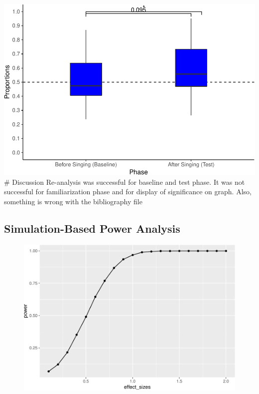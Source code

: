 \documentclass[man,floatsintext]{apa6}
\begin{document}
\includegraphics{Midterm_APA_files/figure-latex/unnamed-chunk-3-1.pdf}
\# Discussion Re-analysis was successful for baseline and test phase. It
was not successful for familiarization phase and for display of
significance on graph. Also, something is wrong with the bibliography
file

\subsection{Simulation-Based Power
Analysis}\label{simulation-based-power-analysis}

\begin{figure}
\centering
\includegraphics{Midterm_APA_files/figure-latex/unnamed-chunk-4-1.pdf}
\caption{}
\end{figure}

\newpage
\end{document}
